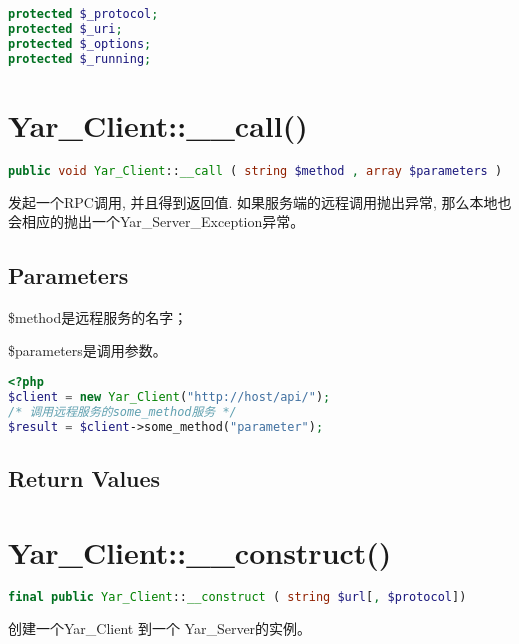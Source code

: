 \begin{lstlisting}[language=PHP]
protected $_protocol;
protected $_uri;
protected $_options;
protected $_running;
\end{lstlisting}


\section{Yar\_Client::\_\_call()}

\begin{lstlisting}[language=PHP]
public void Yar_Client::__call ( string $method , array $parameters )
\end{lstlisting}

发起一个RPC调用, 并且得到返回值. 如果服务端的远程调用抛出异常, 那么本地也会相应的抛出一个Yar\_Server\_Exception异常。


\subsection{Parameters}


\begin{compactitem}
\item \$method是远程服务的名字；
\item \$parameters是调用参数。
\end{compactitem}



\begin{lstlisting}[language=PHP]
<?php
$client = new Yar_Client("http://host/api/");
/* 调用远程服务的some_method服务 */
$result = $client->some_method("parameter");
\end{lstlisting}

\subsection{Return Values}


\section{Yar\_Client::\_\_construct()}





\begin{lstlisting}[language=PHP]
final public Yar_Client::__construct ( string $url[, $protocol])
\end{lstlisting}

创建一个Yar\_Client 到一个 Yar\_Server的实例。

